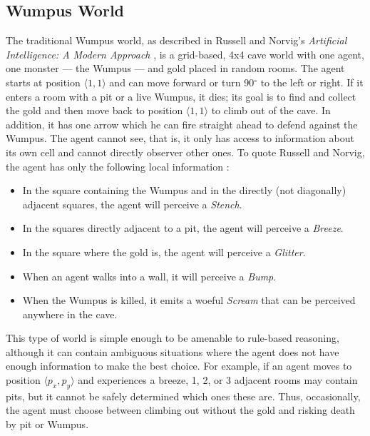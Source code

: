 \subsection{Wumpus World}

The traditional Wumpus world, as described in Russell and Norvig's {\em Artificial Intelligence: A Modern Approach} \cite[p.\ 236]{norvig}, is a grid-based, 4x4 cave world with one agent, one monster --- the Wumpus --- and gold placed in random rooms. The agent starts at position $\langle 1,1\rangle$ and can move forward or turn 90$^\circ$ to the left or right. If it enters a room with a pit or a live Wumpus, it dies; its goal is to find and collect the gold and then move back to position $\langle 1,1\rangle$ to climb out of the cave. In addition, it has one arrow which he can fire straight ahead to defend against the Wumpus. The agent cannot see, that is, it only has access to information about its own cell and cannot directly observer other ones. To quote Russell and Norvig, the agent has only the following local information \cite[p.\ 237]{norvig}:
\begin{emquote}
	\begin{itemize}
		\item In the square containing the Wumpus and in the directly (not diagonally) adjacent squares, the agent will perceive a {\em Stench}.
		\item In the squares directly adjacent to a pit, the agent will perceive a {\em Breeze}.
		\item In the square where the gold is, the agent will perceive a {\em Glitter}.
		\item When an agent walks into a wall, it will perceive a {\em Bump}.
		\item When the Wumpus is killed, it emits a woeful {\em Scream} that can be perceived anywhere in the cave.
	\end{itemize}
\end{emquote}
\vspace{-3mm}
This type of world is simple enough to be amenable to rule-based reasoning, although it can contain ambiguous situations where the agent does not have enough information to make the best choice. For example, if an agent moves to position $\langle p_x,p_y \rangle$ and experiences a breeze, 1, 2, or 3 adjacent rooms may contain pits, but it cannot be safely determined which ones these are. Thus,  occasionally, the agent must choose between climbing out without the gold and risking death by pit or Wumpus.

